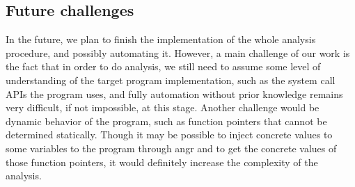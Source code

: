 
\subsection{Future challenges}

In the future, we plan to finish the implementation of the whole analysis
procedure, and possibly automating it. However, a main challenge of our work is
the fact that in order to do analysis, we still need to assume some level of
understanding of the target program implementation, such as the system call APIs
the program uses, and fully automation without prior knowledge remains very
difficult, if not impossible, at this stage. Another challenge would be dynamic
behavior of the program, such as function pointers that cannot be determined
statically. Though it may be possible to inject concrete values to some
variables to the program through angr and to get the concrete values of those
function pointers, it would definitely increase the complexity of the analysis.

